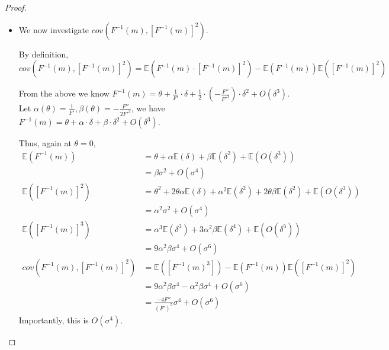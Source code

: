 \begin{proof}
\begin{itemize}
    \item We now investigate {$cov\left(F^{-1}(m),[F^{-1}(m)]^2\right)$}.

    By definition, $cov(F^{-1}(m),[F^{-1}(m)]^2) = \mathbb{E}(F^{-1}(m) \cdot [F^{-1}(m)]^2) - \mathbb{E}(F^{-1}(m))\mathbb{E}([F^{-1}(m)]^2)$

    From the above we know $F^{-1}(m) = \theta + \frac{1}{F'} \cdot \delta + \frac{1}{2} \cdot \left(-\frac{F''}{F'^3}\right) \cdot \delta^2 + O(\delta^3)$. Let $\alpha(\theta)=\frac{1}{F'}, \beta(\theta) = -\frac{F''}{2F'^3}$, we have $F^{-1}(m) = \theta + \alpha \cdot \delta +  \beta \cdot \delta^2 + O(\delta^3)$. 

    Thus, again at $\theta=0$,
    \begin{align*}
        \mathbb{E}(F^{-1}(m)) &= \theta + \alpha\mathbb{E}(\delta) + \beta\mathbb{E}(\delta^2) + \mathbb{E}(O(\delta^3))\\
        &= \beta \sigma^2 + O(\sigma^4) \\
        \mathbb{E}([F^{-1}(m)]^2) &= \theta^2 + 2\theta \alpha \mathbb{E}(\delta) + \alpha^2\mathbb{E}(\delta^2)+    2 \theta \beta \mathbb{E}(\delta^2) + \mathbb{E}(O(\delta^3))\\
        &= \alpha^2\sigma^2 + O(\sigma^4) \\
        \mathbb{E}([F^{-1}(m)]^3) &= \alpha^3\mathbb{E}(\delta^3) + 3\alpha^2\beta\mathbb{E}(\delta^4)+\mathbb{E}(O(\delta^5))\\
        &= 9\alpha^2\beta\sigma^4 + O(\sigma^6)\\
        cov(F^{-1}(m),[F^{-1}(m)]^2) &= \mathbb{E}([F^{-1}(m)^3]) - \mathbb{E}(F^{-1}(m))\mathbb{E}([F^{-1}(m)]^2)\\
        &= 9\alpha^2\beta\sigma^4 - \alpha^2\beta \sigma^4 + O(\sigma^6)\\
        &= \frac{-4F''}{(F')^5}\sigma^4 + O(\sigma^6)
    \end{align*}
    Importantly, this is $O(\sigma^4)$.


\end{itemize}
\end{proof}
